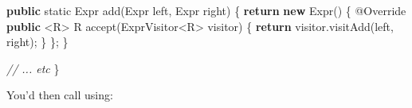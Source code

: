 \documentclass[]{article}
\newenvironment{Shaded}{}{}
\newcommand{\AttributeTok}[1]{\textcolor[rgb]{0.49,0.56,0.16}{#1}}
\newcommand{\CommentTok}[1]{\textcolor[rgb]{0.38,0.63,0.69}{\textit{#1}}}
\newcommand{\ControlFlowTok}[1]{\textcolor[rgb]{0.00,0.44,0.13}{\textbf{#1}}}
\newcommand{\DataTypeTok}[1]{\textcolor[rgb]{0.56,0.13,0.00}{#1}}
\newcommand{\FunctionTok}[1]{\textcolor[rgb]{0.02,0.16,0.49}{#1}}
\newcommand{\KeywordTok}[1]{\textcolor[rgb]{0.00,0.44,0.13}{\textbf{#1}}}
\newcommand{\NormalTok}[1]{#1}
\newcommand{\OperatorTok}[1]{\textcolor[rgb]{0.40,0.40,0.40}{#1}}
\begin{document}
\begin{Shaded}
\begin{Highlighting}[]
    \KeywordTok{public} \DataTypeTok{static}\NormalTok{ Expr }\FunctionTok{add}\OperatorTok{(}\NormalTok{Expr left}\OperatorTok{,}\NormalTok{ Expr right}\OperatorTok{)} \OperatorTok{\{}
        \ControlFlowTok{return} \KeywordTok{new} \FunctionTok{Expr}\OperatorTok{()} \OperatorTok{\{}
            \AttributeTok{@Override}
            \KeywordTok{public} \OperatorTok{\textless{}}\NormalTok{R}\OperatorTok{\textgreater{}}\NormalTok{ R }\FunctionTok{accept}\OperatorTok{(}\NormalTok{ExprVisitor}\OperatorTok{\textless{}}\NormalTok{R}\OperatorTok{\textgreater{}}\NormalTok{ visitor}\OperatorTok{)} \OperatorTok{\{}
                \ControlFlowTok{return}\NormalTok{ visitor}\OperatorTok{.}\FunctionTok{visitAdd}\OperatorTok{(}\NormalTok{left}\OperatorTok{,}\NormalTok{ right}\OperatorTok{);}
            \OperatorTok{\}}
        \OperatorTok{\};}
    \OperatorTok{\}}

    \CommentTok{// ... etc}
\OperatorTok{\}}
\end{Highlighting}
\end{Shaded}

You'd then call using:
\end{document}
